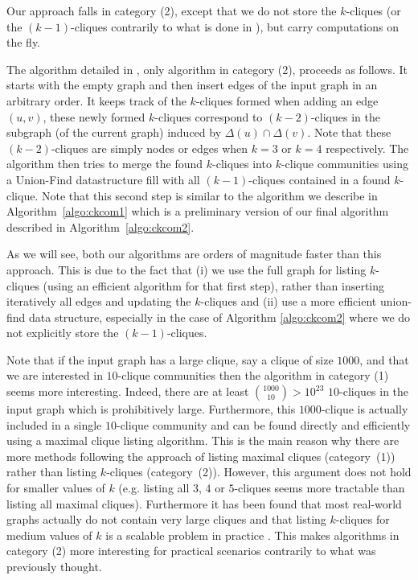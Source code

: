 Our approach falls in category (2), except that we do not store the $k$-cliques (or the $(k-1)$-cliques contrarily to what is done in \cite{kumpula2008sequential}), but carry computations on the fly. %

The algorithm detailed in \cite{kumpula2008sequential}, only algorithm in category (2), proceeds as follows. It starts with the empty graph and then insert edges of the input graph in an arbitrary order. It keeps track of the $k$-cliques formed when adding an edge $(u,v)$, these newly formed $k$-cliques correspond to $(k-2)$-cliques in the subgraph (of the current graph) induced by $\Delta(u)\cap\Delta(v)$. Note that these $(k-2)$-cliques are simply nodes or edges when $k=3$ or $k=4$ respectively. The algorithm then tries to merge the found $k$-cliques into $k$-clique communities using a Union-Find datastructure fill with all $(k-1)$-cliques contained in a found $k$-clique. Note that this second step is similar to the algorithm we describe in Algorithm~\ref{algo:ckcom1} which is a preliminary version of our final algorithm described in Algorithm~\ref{algo:ckcom2}.

As we will see, both our algorithms are orders of magnitude faster than this approach. This is due to the fact that (i) we use the full graph for listing $k$-cliques (using an efficient algorithm for that first step), rather than inserting iteratively all edges and updating the $k$-cliques and (ii) use a more efficient union-find data structure, especially in the case of Algorithm \ref{algo:ckcom2} where we do not explicitly store the $(k-1)$-cliques.

Note that if the input graph has a large clique, say a clique of size $1000$, and that we are interested in $10$-clique communities then the algorithm in category (1) seems more interesting. Indeed, there are at least ${1000 \choose 10}>10^{23}$ $10$-cliques in the input graph which is prohibitively large. Furthermore, this $1000$-clique is actually included in a single $10$-clique community and can be found directly and efficiently using a maximal clique listing algorithm. This is the main reason why there are more methods following the approach of listing maximal cliques (category~(1)) rather than listing $k$-cliques (category~(2)).
However, this argument does not hold for smaller values of $k$ (e.g. listing all $3$, $4$ or $5$-cliques seems more tractable than listing all maximal cliques). Furthermore it has been found that most real-world graphs actually do not contain very large cliques and that listing $k$-cliques for medium values of $k$ is a scalable problem in practice \cite{}. This makes algorithms in category (2) more interesting for practical scenarios contrarily to what was previously thought.

